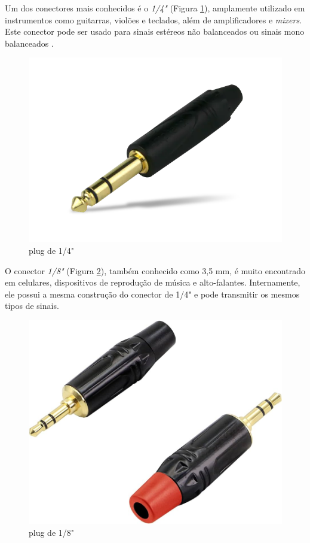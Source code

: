 Um dos conectores mais conhecidos é o \textit{1/4"} (Figura \ref{fig19}), amplamente utilizado em instrumentos como guitarras, violões e teclados, além de amplificadores e \textit{mixers}. Este conector pode ser usado para sinais estéreos não balanceados ou sinais mono balanceados \cite{bartlett}.

\begin{figure}[h]
	\centering
    \includegraphics[scale=0.2]{figuras/fig19.png}
	\caption{plug de 1/4" \cite{mouser}}
	\label{fig19}
\end{figure}

O conector \textit{1/8"} (Figura \ref{fig20}), também conhecido como 3,5 mm, é muito encontrado em celulares, dispositivos de reprodução de música e alto-falantes. Internamente, ele possui a mesma construção do conector de 1/4" e pode transmitir os mesmos tipos de sinais.

\begin{figure}[h]
	\centering
    \includegraphics[scale=0.2]{figuras/fig20.png}
	\caption{plug de 1/8" \cite{mouser}}
	\label{fig20}
\end{figure}

